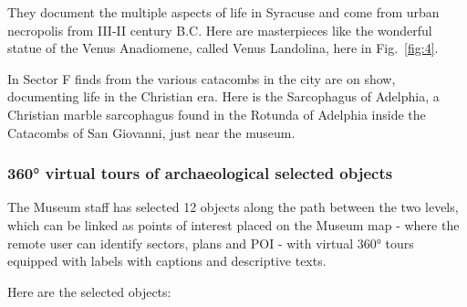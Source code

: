 \documentclass[amsthm,ebook]{saparticle}
\begin{document}
They document the multiple aspects of life in Syracuse and come from urban necropolis from III-II century B.C. Here are
masterpieces like the wonderful statue of the Venus Anadiomene, called Venus Landolina, here in Fig.~\ref{fig:4}.

In Sector F finds from the various catacombs in the city are on show, documenting life in the Christian era. Here is the
Sarcophagus of Adelphia, a Christian marble sarcophagus found in the Rotunda of Adelphia inside the Catacombs of San
Giovanni, just near the museum.




\subsubsection{360° virtual tours of archaeological selected objects}


\noindent The Museum staff has selected 12 objects along the path between the two levels, which can be linked as points of
interest placed on the Museum map - where the remote user can identify sectors, plans and POI - with virtual 360° tours
equipped with labels with captions and descriptive texts.

Here are the selected objects:
\end{document}
